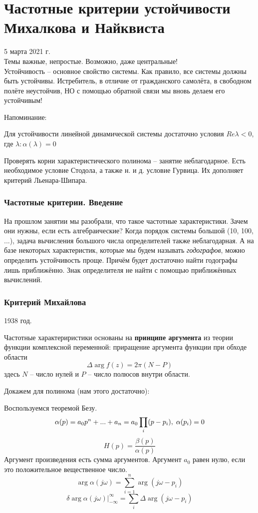 \documentclass[main.tex]{subfiles}
\begin{document}
	
\section{ Частотные критерии устойчивости Михалкова и Найквиста }
5 марта 2021 г. \\

Темы важные, непростые.
Возможно, даже центральные! \\

Устойчивость -- основное свойство системы.
Как правило, все системы должны быть устойчивы.
Истребитель, в отличие от гражданского самолёта, в свободном полёте неустойчив, НО с помощью обратной связи мы вновь делаем его устойчивым!

Напоминание:

Для устойчивости линейной динамической системы достаточно условия $ \boxed{Re \lambda < 0} $, где $ \lambda : \alpha(\lambda) = 0 $

Проверять корни характеристического полинома -- занятие неблагодарное.
Есть необходимое условие Стодола, а также н. и д. условие Гурвица.
Их дополняет критерий Льенара-Шипара.

\subsubsection{Частотные критерии. Введение}

На прошлом занятии мы разобрали, что такое частотные характеристики.
Зачем они нужны, если есть алгебраические?
Когда порядок системы большой (10, 100, ...), задача вычисления большого числа определителей также неблагодарная.
А на базе некоторых характеристик, которые мы будем называть \emph{годографов}, можно определить устойчивость проще.
Причём будет достаточно найти годографы лишь приближённо.
Знак определителя не найти с помощью приближённых вычислений.

\subsubsection{Критерий Михайлова}
1938 год.

Частотные характериристики основаны на \textbf{принципе аргумента} из теории функции комплексной переменной: приращение аргумента функции при обходе области
$$ \Delta \arg f(z) = 2 \pi (N - P) $$
здесь $N$ -- число нулей и $ P $ -- число полюсов внутри области.

Докажем для полинома (нам этого достаточно):

Воспользуемся теоремой Безу.
$$ \alpha(p) = a_0 p^n + ... + a_n = a_0 \prod_i (p - p_i), \thickspace \alpha(p_i) = 0 $$
$$ H(p) = \frac{\beta(p)}{\alpha(p)} $$
Аргумент произведения есть сумма аргументов.
Аргумент $ a_0 $ равен нулю, если это положительное вещественное число.
$$ \arg \alpha(j \omega) = \sum_{i=1}^{n} \arg (j \omega - p_i) $$
$$ \delta \arg \alpha(j \omega) |_{-\infty}^\infty = \sum_i \Delta \arg (j \omega - p_i) $$
\end{document}

